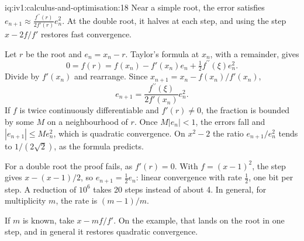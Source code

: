 \begin{solution}{iq:iv1:calculus-and-optimisation:18}
Near a simple root, the error satisfies $e_{n + 1} \approx \frac{f^{\prime\prime}(r)}{2f'(r)}e_n^2$. At the double root, it halves at each step, and using the step $x - 2f/f'$ restores fast convergence.

Let $r$ be the root and $e_n = x_n - r$. Taylor's formula at $x_n$, with a remainder, gives
\[
0 = f(r) = f(x_n) - f'(x_n)e_n + \tfrac12 f^{\prime\prime}(\xi)e_n^2.
\]
Divide by $f'(x_n)$ and rearrange. Since $x_{n + 1} = x_n - f(x_n)/f'(x_n)$,
\[
e_{n + 1} = \frac{f^{\prime\prime}(\xi)}{2f'(x_n)}e_n^2.
\]
If $f$ is twice continuously differentiable and $f'(r) \ne 0$, the fraction is bounded by some $M$ on a neighbourhood of $r$. Once $M|e_n| < 1$, the errors fall and $|e_{n + 1}| \le M e_n^2$, which is quadratic convergence. On $x^2 - 2$ the ratio $e_{n + 1}/e_n^2$ tends to $1/(2\sqrt{2})$, as the formula predicts.

For a double root the proof fails, as $f'(r) = 0$. With $f = (x - 1)^2$, the step gives $x - (x - 1)/2$, so $e_{n + 1} = \frac12 e_n$: linear convergence with rate $\frac12$, one bit per step. A reduction of $10^6$ takes 20 steps instead of about 4. In general, for multiplicity $m$, the rate is $(m - 1)/m$.

If $m$ is known, take $x - mf/f'$. On the example, that lands on the root in one step, and in general it restores quadratic convergence.



\end{solution}

